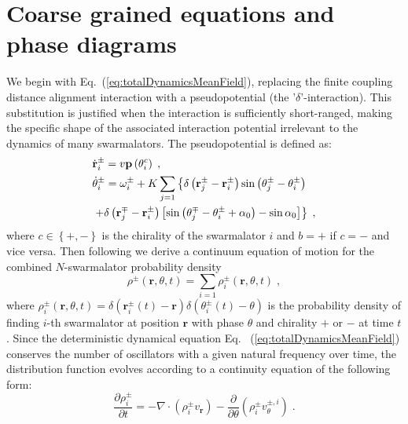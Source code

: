 \documentclass{article}
\begin{document}
\section{\label{sec:analysis}Coarse grained equations and phase diagrams}

We begin with Eq.~(\ref{eq:totalDynamicsMeanField}), replacing the finite coupling distance alignment interaction with a pseudopotential (the '$\delta$'-interaction). This substitution is justified when the interaction is sufficiently short-ranged, making the specific shape of the associated interaction potential irrelevant to the dynamics of many swarmalators. The pseudopotential is defined as:
\begin{subequations}
    \begin{align}
        &\dot{\mathbf{r}}_{i}^{\pm}=v\mathbf{p}\left( \theta _{i}^{c} \right) \;,\\
        &\dot{\theta}_{i}^{\pm}=\omega _{i}^{\pm}+K\sum_{j=1}{\left\{ \delta \left( \mathbf{r}_{j}^{\pm}-\mathbf{r}_{i}^{\pm} \right) \sin \left( \theta _{j}^{\pm}-\theta _{i}^{\pm} \right) \right.}\notag\\
        &\left. +\delta \left( \mathbf{r}_{j}^{\mp}-\mathbf{r}_{i}^{\pm} \right) \left[ \sin \left( \theta _{j}^{\mp}-\theta _{i}^{\pm}+\alpha _0 \right) -\sin \alpha _0 \right] \right\} \;,
    \end{align}
\end{subequations}
where $c\in\left\{+,-\right\}$ is the chirality of the swarmalator $i$ and $b=+$ if $c=-$ and vice versa.  
Then following \cite{David_S_Dean_1996} we derive a continuum equation of motion for the combined $N$-swarmalator probability density
\begin{equation}
    \label{eq:globalContinuityDef}
    \rho ^{\pm}\left( \mathbf{r},\theta ,t \right) =\sum_{i=1}{\rho _{i}^{\pm}\left( \mathbf{r},\theta ,t \right)}\;,
\end{equation}
where $\rho _{i}^{\pm}\left( \mathbf{r},\theta ,t \right) =\delta \left( \mathbf{r}_{i}^{\pm}\left( t \right) -\mathbf{r} \right) \delta \left( \theta _{i}^{\pm}\left( t \right) -\theta \right)$ is the probability density of finding $i$-th swarmalator at position $\mathbf{r}$ with phase $\theta$ and chirality $+$ or $-$ at time $t$.
Since the deterministic dynamical equation Eq.~ (\ref{eq:totalDynamicsMeanField}) conserves the number of oscillators with a given natural frequency over time, the distribution function evolves according to a continuity equation of the following form:
\begin{equation}
    \frac{\partial \rho _{i}^{\pm}}{\partial t}=-\nabla \cdot \left( \rho _{i}^{\pm}v_{\mathbf{r}} \right) -\frac{\partial}{\partial \theta}\left( \rho _{i}^{\pm}v_{\theta}^{\pm ,i} \right) \;.
    \label{eq:singleContinuity}
\end{equation}
\end{document}
